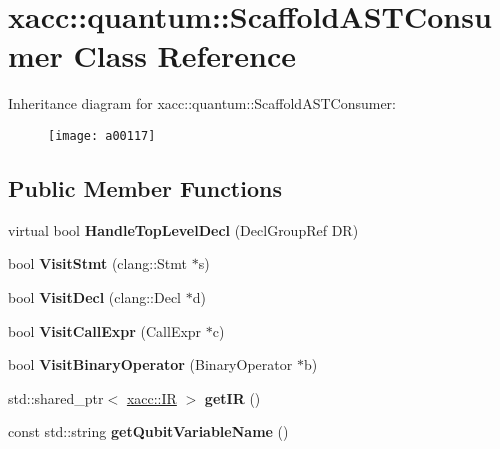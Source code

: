 \hypertarget{a00117}{}\section{xacc\+:\+:quantum\+:\+:Scaffold\+A\+S\+T\+Consumer Class Reference}
\label{a00117}
Inheritance diagram for xacc\+:\+:quantum\+:\+:Scaffold\+A\+S\+T\+Consumer\+:\begin{figure}[H]
\begin{center}
\leavevmode
\texttt{[image: a00117]}
\end{center}
\end{figure}
\subsection*{Public Member Functions}
\begin{DoxyCompactItemize}
\item 
virtual bool {\bfseries Handle\+Top\+Level\+Decl} (Decl\+Group\+Ref DR)\hypertarget{a00117_ae846fd40684f3a1f820b8711e1204089}{}\label{a00117_ae846fd40684f3a1f820b8711e1204089}

\item 
bool {\bfseries Visit\+Stmt} (clang\+::\+Stmt $\ast$s)\hypertarget{a00117_a6693c27f68332d8142fbdcb405e3259b}{}\label{a00117_a6693c27f68332d8142fbdcb405e3259b}

\item 
bool {\bfseries Visit\+Decl} (clang\+::\+Decl $\ast$d)\hypertarget{a00117_ae6a05fe567cd8ea15feb694dbb898c33}{}\label{a00117_ae6a05fe567cd8ea15feb694dbb898c33}

\item 
bool {\bfseries Visit\+Call\+Expr} (Call\+Expr $\ast$c)\hypertarget{a00117_a1478fc9e887b04d2ad2aa8347ef6bbcb}{}\label{a00117_a1478fc9e887b04d2ad2aa8347ef6bbcb}

\item 
bool {\bfseries Visit\+Binary\+Operator} (Binary\+Operator $\ast$b)\hypertarget{a00117_a3f2f070888678caf53e57041b4f5ddd6}{}\label{a00117_a3f2f070888678caf53e57041b4f5ddd6}

\item 
std\+::shared\+\_\+ptr$<$ \hyperlink{a00077}{xacc\+::\+IR} $>$ {\bfseries get\+IR} ()\hypertarget{a00117_af9dbfa7c52b8a7de99132257e154e29a}{}\label{a00117_af9dbfa7c52b8a7de99132257e154e29a}

\item 
const std\+::string {\bfseries get\+Qubit\+Variable\+Name} ()\hypertarget{a00117_aa301f0bcae6fb5a1c17557ba08144cb4}{}\label{a00117_aa301f0bcae6fb5a1c17557ba08144cb4}

\end{DoxyCompactItemize}
